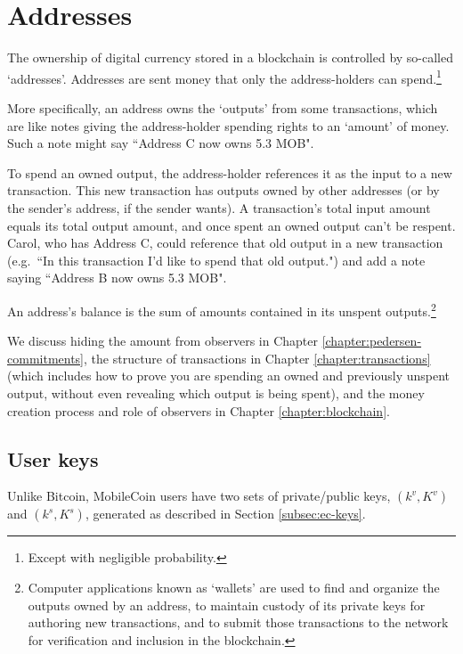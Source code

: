 \chapter{Addresses}
\label{chapter:addresses}

The ownership of digital currency stored in a blockchain is controlled by so-called `addresses'. Addresses are sent money that only the address-holders can spend.\footnote{Except with negligible probability.}

More specifically, an address owns the `outputs' from some transactions, which are like notes giving the address-holder spending rights to an `amount' of money. Such a note might say ``Address C now owns 5.3 MOB".

To spend an owned output, the address-holder references it as the input to a new transaction. This new transaction has outputs owned by other addresses (or by the sender's address, if the sender wants). A transaction's total input amount equals its total output amount, and once spent an owned output can't be respent. Carol, who has Address C, could reference that old output in a new transaction (e.g.\ ``In this transaction I'd like to spend that old output.") and add a note saying ``Address B now owns 5.3 MOB".

An address's balance is the sum of amounts contained in its unspent outputs.\footnote{Computer applications known as `wallets' are used to find and organize the outputs owned by an address, to maintain custody of its private keys for authoring new transactions, and to submit those transactions to the network for verification and inclusion in the blockchain.}

We discuss hiding the amount from observers in Chapter \ref{chapter:pedersen-commitments}, the structure of transactions in Chapter \ref{chapter:transactions} (which includes how to prove you are spending an owned and previously unspent output, without even revealing which output is being spent), and the money creation process and role of observers in Chapter \ref{chapter:blockchain}.



\section{User keys}
\label{sec:user-keys}

Unlike Bitcoin, MobileCoin users have two sets of private/public keys, \((k^v, K^v)\) and \( (k^s, K^s) \), generated as described in Section \ref{subsec:ec-keys}.

